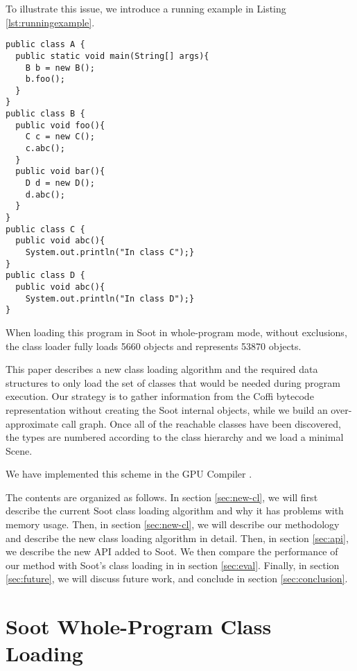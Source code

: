 \documentclass[preprint]{sigplanconf}
\begin{document}
To illustrate this issue, we introduce a running example in Listing \ref{lst:runningexample}.

\begin{lstlisting}[caption={Running example},label={lst:runningexample},float=!ht]
public class A {
  public static void main(String[] args){
    B b = new B();
    b.foo();
  }
}
public class B {
  public void foo(){
    C c = new C();
    c.abc();
  }
  public void bar(){
    D d = new D();
    d.abc();
  }
}
public class C {
  public void abc(){
    System.out.println("In class C");}
}
public class D {
  public void abc(){
    System.out.println("In class D");}
}
\end{lstlisting}

When loading this program in Soot in whole-program mode, without exclusions, the class loader fully loads 5660 \sootclass objects and represents 53870 \sootmethod objects. %

This paper describes a new class loading algorithm and the required data structures to only load the set of classes that would be needed during program execution. Our strategy is to gather information from the Coffi bytecode representation without creating the Soot internal objects, while we build an over-approximate call graph. Once all of the reachable classes have been discovered, the types are numbered according to the class hierarchy and we load a minimal Scene.

We have implemented this scheme in the \rb GPU Compiler \cite{rootbeer}. 

The contents are organized as follows. In section \ref{sec:new-cl}, we will first describe the current Soot class loading algorithm and why it has problems with memory usage. Then, in section \ref{sec:new-cl}, we will describe our methodology and describe the new class loading algorithm in detail. Then, in section \ref{sec:api}, we describe the new API added to Soot. We then compare the performance of our method with Soot's class loading in \rb in section \ref{sec:eval}. Finally, in section \ref{sec:future}, we will discuss future work, and conclude in section \ref{sec:conclusion}.

\section{Soot Whole-Program Class Loading}
\label{sec:soot-cl}
\end{document}
